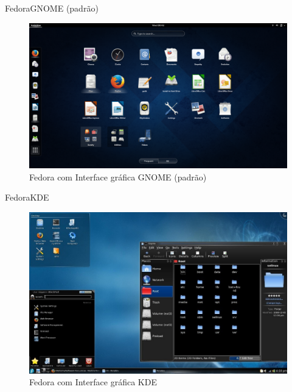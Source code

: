 \documentclass{beamer}
\begin{document}
\begin{frame}{Fedora}{GNOME (padrão)}
 \begin{figure}[h!]
        \centering
        \includegraphics[scale=0.16]{fedoraGNOME.png}
        \caption{Fedora com Interface gráfica GNOME (padrão)}
        \label{fig:Comando ls}
    \end{figure}
\end{frame}

\begin{frame}{Fedora}{KDE}
 \begin{figure}[h!]
        \centering
        \includegraphics[scale=0.48]{FedoraKDE.jpg}
        \caption{Fedora com Interface gráfica KDE}
        \label{fig:Comando ls}
    \end{figure}
\end{frame}
\end{document}
